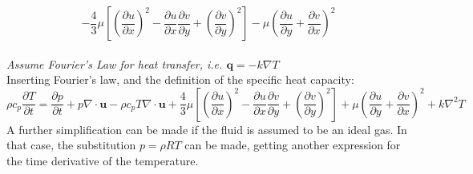 \documentclass{article}
\begin{document}
$$-\frac{4}{3} \mu \left[ \left( \frac{\partial u}{\partial x} \right)^{2}  -\frac{\partial u}{\partial x} \frac{\partial v}{\partial y} +\left( \frac{\partial v}{\partial y} \right)^{2}  \right]  -\mu \left( \frac{\partial u}{\partial y} +\frac{\partial v}{\partial x} \right)^{2}  $$ \\
\textit{Assume Fourier's Law for heat transfer, i.e. $\textbf{q} = -k\nabla T$}\\
Inserting Fourier's law, and the definition of the specific heat capacity:
$$\rho c_{p}\frac{\partial T}{\partial t} =\frac{\partial p}{\partial t} +p\nabla \cdot \textbf{u}-\rho c_{p}T\nabla \cdot \textbf{u}+\frac{4}{3} \mu \left[ \left( \frac{\partial u}{\partial x} \right)^{2}  -\frac{\partial u}{\partial x} \frac{\partial v}{\partial y} +\left( \frac{\partial v}{\partial y} \right)^{2}  \right]  +\mu \left( \frac{\partial u}{\partial y} +\frac{\partial v}{\partial x} \right)^{2}  +k\nabla^{2} T$$
A further simplification can be made if the fluid is assumed to be an ideal gas. In that case, the substitution $p = \rho RT$ can be made, getting another expression for the time derivative of the temperature.
\end{document}
